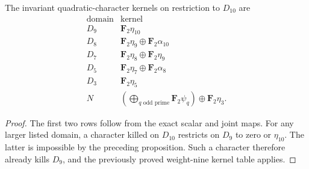\begin{corollary}\label{cor:weight-ten-character-kernels}
The invariant quadratic-character kernels on restriction to
$D_{10}$ are
\[
\begin{array}{c|l}
 \text{domain}&\text{kernel}\\ \hline
 D_9&\mathbf F_2\eta_{10}\\
 D_8&\mathbf F_2\eta_9\oplus\mathbf F_2\alpha_{10}\\
 D_7&\mathbf F_2\eta_8\oplus\mathbf F_2\eta_9\\
 D_5&\mathbf F_2\eta_7\oplus\mathbf F_2\alpha_8\\
 D_3&\mathbf F_2\eta_5\\
 N&\displaystyle\left(\bigoplus_{q\text{ odd prime}}\mathbf F_2\psi_q\right)
                    \oplus\mathbf F_2\eta_3.
\end{array}
\]
\end{corollary}

\begin{proof}
The first two rows follow from the exact scalar and joint maps.
For any larger listed domain, a character killed on $D_{10}$
restricts on $D_9$ to zero or $\eta_{10}$. The latter is impossible
by the preceding proposition. Such a character therefore already
kills $D_9$, and the previously proved weight-nine kernel table
applies.
\end{proof}
